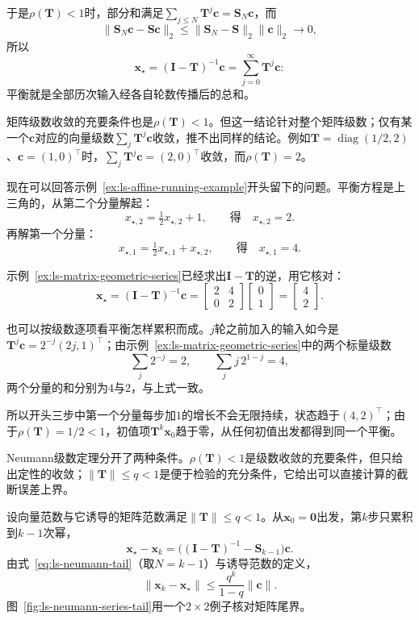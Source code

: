 于是$\rho(\bm T)<1$时，部分和满足$\sum_{j\leq N}\bm T^j\bm c=\bm S_N\bm c$，而
\[
 \lVert\bm S_N\bm c-\bm S\bm c\rVert_2\leq\lVert\bm S_N-\bm S\rVert_2\lVert\bm c\rVert_2\to0 ,
\]
所以
\[
 \bm x_\star=(\bm I-\bm T)^{-1}\bm c=\sum_{j=0}^{\infty}\bm T^j\bm c :
\]
平衡就是全部历次输入经各自轮数传播后的总和。

矩阵级数收敛的充要条件也是$\rho(\bm T)<1$。但这一结论针对整个矩阵级数；仅有某一个$\bm c$对应的向量级数$\sum_j\bm T^j\bm c$收敛，推不出同样的结论。例如$\bm T=\operatorname{diag}(1/2,2)$、$\bm c=(1,0)^\top$时，$\sum_j\bm T^j\bm c=(2,0)^\top$收敛，而$\rho(\bm T)=2$。

\begin{example}[贯穿例的平衡]
\label{ex:ls-affine-running-equilibrium}
现在可以回答示例~\ref{ex:ls-affine-running-example}开头留下的问题。平衡方程是上三角的，从第二个分量解起：
\[
 x_{\star,2}=\tfrac12x_{\star,2}+1,\qquad\text{得}\quad x_{\star,2}=2 .
\]
再解第一个分量：
\[
 x_{\star,1}=\tfrac12x_{\star,1}+x_{\star,2},\qquad\text{得}\quad x_{\star,1}=4 .
\]

示例~\ref{ex:ls-matrix-geometric-series}已经求出$\bm I-\bm T$的逆，用它核对：
\[
 \bm x_\star=(\bm I-\bm T)^{-1}\bm c=\begin{bmatrix}2&4\\0&2\end{bmatrix}\begin{bmatrix}0\\1\end{bmatrix}=\begin{bmatrix}4\\2\end{bmatrix}.
\]

也可以按级数逐项看平衡怎样累积而成。$j$轮之前加入的输入如今是$\bm T^j\bm c=2^{-j}(2j,1)^\top$；由示例~\ref{ex:ls-matrix-geometric-series}中的两个标量级数
\[
 \sum_j2^{-j}=2,\qquad\sum_jj\,2^{1-j}=4 ,
\]
两个分量的和分别为$4$与$2$，与上式一致。

所以开头三步中第一个分量每步加$1$的增长不会无限持续，状态趋于$(4,2)^\top$；由于$\rho(\bm T)=1/2<1$，初值项$\bm T^k\bm x_0$趋于零，从任何初值出发都得到同一个平衡。
\end{example}

Neumann级数定理分开了两种条件。$\rho(\bm T)<1$是级数收敛的充要条件，但只给出定性的收敛；$\lVert\bm T\rVert\leq q<1$是便于检验的充分条件，它给出可以直接计算的截断误差上界。

设向量范数与它诱导的矩阵范数满足$\lVert\bm T\rVert\leq q<1$。从$\bm x_0=\bm0$出发，第$k$步只累积到$k-1$次幂，
\[
 \bm x_\star-\bm x_k=\bigl((\bm I-\bm T)^{-1}-\bm S_{k-1}\bigr)\bm c .
\]
由式~\eqref{eq:ls-neumann-tail}（取$N=k-1$）与诱导范数的定义，
\begin{equation}
 \lVert\bm x_k-\bm x_\star\rVert\leq\frac{q^k}{1-q}\lVert\bm c\rVert .
 \label{eq:ls-neumann-iterate-error}
\end{equation}
图~\ref{fig:ls-neumann-series-tail}用一个$2\times2$例子核对矩阵尾界。

